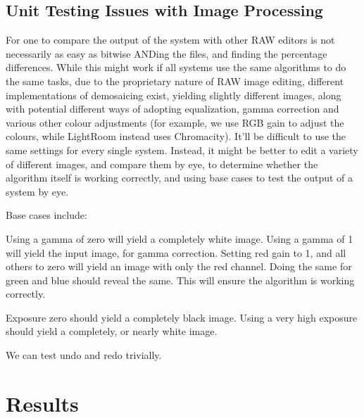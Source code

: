 \documentclass[10pt,a4paper]{article}
\begin{document}
\subsection{Unit Testing Issues with Image Processing}

For one to compare the output of the system with other RAW editors is not necessarily as easy as bitwise ANDing the files, and finding the percentage
differences. While this might work if all systems use the same algorithms to do the same tasks, due to the proprietary nature of RAW image editing,
different implementations of demosaicing exist, yielding slightly different images, along with potential different ways of adopting equalization,
gamma correction and various other colour adjustments (for example, we use RGB gain to adjust the colours, while LightRoom instead uses Chromacity).
It'll be difficult to use the same settings for every single system. Instead, it might be better to edit a variety of different images, and compare them
by eye, to determine whether the algorithm itself is working correctly, and using base cases to test the output of a system by eye.

Base cases include:

Using a gamma of zero will yield a completely white image. Using a gamma of 1 will yield the input image, for gamma correction.
Setting red gain to 1, and all others to zero will yield an image with only the red channel. Doing the same for green and blue should reveal the same.
This will ensure the algorithm is working correctly.

Exposure zero should yield a completely black image. Using a very high exposure should yield a completely, or nearly white image.

We can test undo and redo trivially.
\section{Results}

\end{document}
